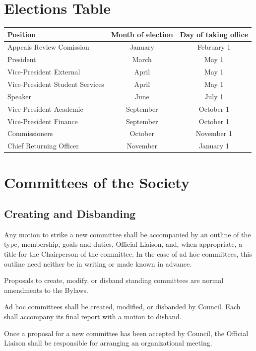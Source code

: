 \newpage

\section{Elections Table}

\begin{center}
    \begin{tabular}{ l |c   c }

    Position & Month of election & Day of taking office \\  \hline
    Appeals Review Comission & January & February 1\\ 
    President & March & May 1\\
    Vice-President External & April & May 1 \\ 
    Vice-President Student Services & April & May 1 \\ 
    Speaker & June & July 1 \\ 
    Vice-President Academic & September & October 1 \\ 
    Vice-President Finance & September & October 1 \\ 
    Commissioners & October & November  1 \\ 
    Chief Returning Officer & November & January 1 \\ 

\end{tabular}
\end{center}


\newpage

\section{Committees of the Society}
\subsection{Creating and Disbanding}
\begin{longenum}[ label*=\thesubsection.\arabic*., align=left]
	\item Any motion to strike a new committee shall be accompanied by an outline of the type, membership, goals and duties, Official Liaison, and, when appropriate, a title for the Chairperson of the committee. In the case of ad hoc committees, this outline need neither be in writing or made known in advance. 
    \item Proposals to create, modify, or disband standing committees are normal amendments to the Bylaws.
    \item Ad hoc committees shall be created, modified, or disbanded by Council. Each shall accompany its final report with a motion to disband.
    \item Once a proposal for a new committee has been accepted by Council, the Official Liaison shall be responsible for arranging an organizational meeting. 
\end{longenum}

